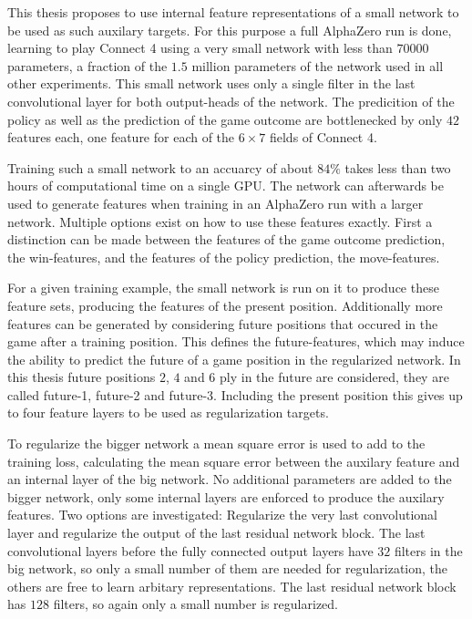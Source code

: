 \documentclass[12pt,onecolumn,oneside,titlepage]{article}
\begin{document}
This thesis proposes to use internal feature representations of a small network to be used as such auxilary targets. For this purpose a full AlphaZero run is done, learning to play Connect 4 using a very small network with less than $70000$ 
parameters, a fraction of the $1.5$ million parameters of the network used in all other experiments. This small network uses only a single filter in the last convolutional layer for both output-heads of the network. The predicition of the policy as well as the prediction of the game outcome 
are bottlenecked by only $42$ features each, one feature for each of the $6 \times 7$ fields of Connect 4.

Training such a small network to an accuarcy of about $84\%$ takes less than two hours of computational time on a single GPU. The network can afterwards be used to generate features when training in an AlphaZero run with a larger network.
Multiple options exist on how to use these features exactly. First a distinction can be made between the features of the game outcome prediction, the win-features, and the features of the policy prediction, the move-features.

For a given training example, the small network is run on it to produce these feature sets, producing the features of the present position. Additionally more features can be generated by considering future positions that occured in the game
after a training position. This defines the future-features, which may induce the ability to predict the future of a game position in the regularized network. In this thesis future positions $2$, $4$ and $6$ ply in the future are considered, they are called future-1, future-2 and future-3.
Including the present position this gives up to four feature layers to be used as regularization targets.

To regularize the bigger network a mean square error is used to add to the training loss, calculating the mean square error between the auxilary feature and an internal layer of the big network. No additional parameters are added to the bigger network,
only some internal layers are enforced to produce the auxilary features. Two options are investigated: Regularize the very last convolutional layer and regularize the output of the last residual network block. The last convolutional layers before
the fully connected output layers have $32$ filters in the big network, so only a small number of them are needed for regularization, the others are free to learn arbitary representations. The last residual network block has $128$ filters, so again only a small number is regularized.
\end{document}
